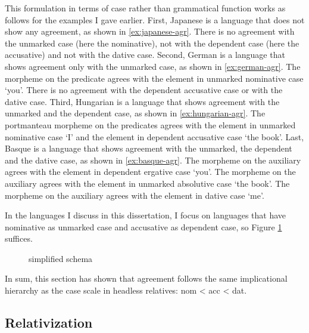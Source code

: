 This formulation in terms of case rather than grammatical function works as follows for the examples I gave earlier.
First, Japanese is a language that does not show any agreement, as shown in \ref{ex:japanese-agr}. There is no agreement with the unmarked case (here the nominative), not with the dependent case (here the accusative) and not with the dative case.
Second, German is a language that shows agreement only with the unmarked case, as shown in \ref{ex:german-agr}. The morpheme  on the predicate agrees with the element in unmarked nominative case  `you'. There is no agreement with the dependent accusative case or with the dative case.
Third, Hungarian is a language that shows agreement with the unmarked and the dependent case, as shown in \ref{ex:hungarian-agr}. The portmanteau morpheme  on the predicates agrees with the element in unmarked nominative case  `I' and the element in dependent accusative case  `the book'.
Last, Basque is a language that shows agreement with the unmarked, the dependent and the dative case, as shown in \ref{ex:basque-agr}. The morpheme  on the auxiliary agrees with the element in dependent ergative case  `you'. The morpheme  on the auxiliary agrees with the element in unmarked absolutive case  `the book'. The morpheme  on the auxiliary agrees with the element in dative case  `me'.

In the languages I discuss in this dissertation, I focus on languages that have nominative as unmarked case and accusative as dependent case, so Figure \ref{fig:agr-nom-acc-dat} suffices.

\begin{figure}[ht]
  \centering
  \label{fig:agr-nom-acc-dat}
  \caption{ simplified schema}
\end{figure}

In sum, this section has shown that agreement follows the same implicational hierarchy as the case scale in headless relatives: \ac{nom} < \ac{acc} < \ac{dat}.


\subsection{Relativization}

